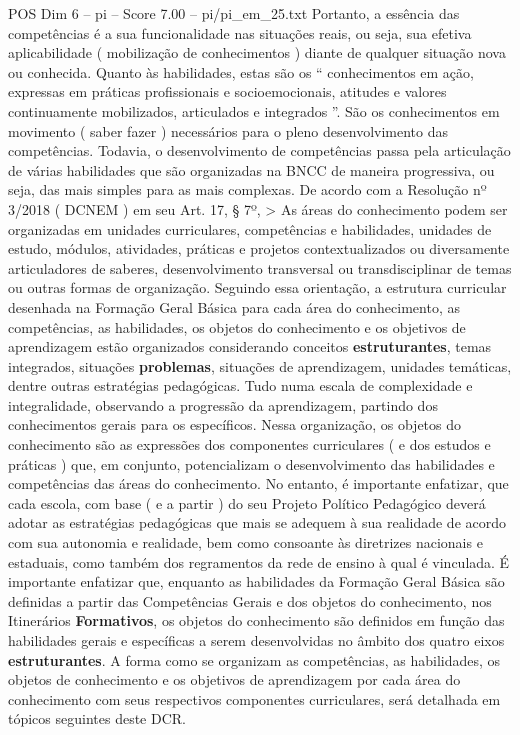 \begin{textsample}{POS Dim 6 – pi – Score 7.00 – pi/pi\_em\_25.txt}
Portanto, a essência das competências é a sua funcionalidade nas situações reais, ou seja, sua efetiva aplicabilidade ( mobilização de conhecimentos ) diante de qualquer situação nova ou conhecida.
Quanto às habilidades, estas são os “ conhecimentos em ação, expressas em práticas profissionais e socioemocionais, atitudes e valores continuamente mobilizados, articulados e integrados ”.
São os conhecimentos em movimento ( saber fazer ) necessários para o pleno desenvolvimento das competências.
Todavia, o desenvolvimento de competências passa pela articulação de várias habilidades que são organizadas na BNCC de maneira progressiva, ou seja, das mais simples para as mais complexas.
De acordo com a Resolução nº 3/2018 ( DCNEM ) em seu Art. 17, § 7º, > As áreas do conhecimento podem ser organizadas em unidades curriculares, competências e habilidades, unidades de estudo, módulos, atividades, práticas e projetos contextualizados ou diversamente articuladores de saberes, desenvolvimento transversal ou transdisciplinar de temas ou outras formas de organização.
Seguindo essa orientação, a estrutura curricular desenhada na Formação Geral Básica para cada área do conhecimento, as competências, as habilidades, os objetos do conhecimento e os objetivos de aprendizagem estão organizados considerando conceitos \textbf{estruturantes}, temas integrados, situações \textbf{problemas}, situações de aprendizagem, unidades temáticas, dentre outras estratégias pedagógicas.
Tudo numa escala de complexidade e integralidade, observando a progressão da aprendizagem, partindo dos conhecimentos gerais para os específicos.
Nessa organização, os objetos do conhecimento são as expressões dos componentes curriculares ( e dos estudos e práticas ) que, em conjunto, potencializam o desenvolvimento das habilidades e competências das áreas do conhecimento.
No entanto, é importante enfatizar, que cada escola, com base ( e a partir ) do seu Projeto Político Pedagógico deverá adotar as estratégias pedagógicas que mais se adequem à sua realidade de acordo com sua autonomia e realidade, bem como consoante às diretrizes nacionais e estaduais, como também dos regramentos da rede de ensino à qual é vinculada.
É importante enfatizar que, enquanto as habilidades da Formação Geral Básica são definidas a partir das Competências Gerais e dos objetos do conhecimento, nos Itinerários \textbf{Formativos}, os objetos do conhecimento são definidos em função das habilidades gerais e específicas a serem desenvolvidas no âmbito dos quatro eixos \textbf{estruturantes}.
A forma como se organizam as competências, as habilidades, os objetos de conhecimento e os objetivos de aprendizagem por cada área do conhecimento com seus respectivos componentes curriculares, será detalhada em tópicos seguintes deste DCR.

\end{textsample}
